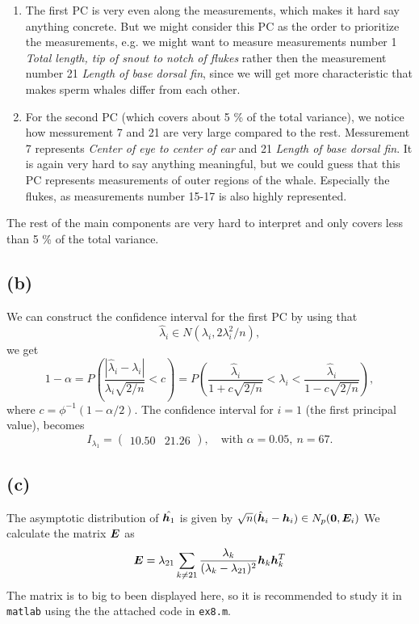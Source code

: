\begin{enumerate}
\item The first PC is very even along the measurements, which makes it
  hard say anything concrete. But we might consider this PC as the
  order to prioritize the measurements, e.g. we might want to measure
  measurements number 1 \textit{Total length, tip of snout to notch of
    flukes} rather then the measurement number 21 \textit{Length of base
    dorsal fin}, since we will get more characteristic that makes sperm
  whales differ from each other.
\item For the second PC (which  covers about 5 \% of the total variance), we notice how messurement 7 and 21 are very
  large compared to the rest. Messurement 7 represents \textit{Center of
    eye to center of ear} and 21 \textit{Length of base  dorsal fin}. It
  is again very hard to say anything meaningful, but we could guess that
  this PC represents measurements of outer regions of the
  whale. Especially the flukes, as measurements number 15-17 is also
  highly represented.
\end{enumerate}
The rest of the main components are very hard to interpret and only
covers less than 5 \% of the total variance.

\subsection*{(b)}
\label{sec:b-7}
 We can construct the confidence interval for the first PC by using
 that
 \begin{equation*}
   \hat\lambda_i \in N(\lambda_i, 2\lambda^2_i/n),
 \end{equation*}
we get
\begin{equation*}
 1- \alpha =  P\left(\frac{|\hat\lambda_i - \lambda_i|}{\lambda_i\sqrt{2/n}} < c\right) =
 P\left(\frac{\hat\lambda_i}{1 + c\sqrt{2/n}} < \lambda_{i} < \frac{\hat\lambda_i}{1 - c\sqrt{2/n}}\right),
\end{equation*}
where $c = \phi^{-1}(1 - \alpha/2)$. The confidence interval for $i =
1$ (the first principal value), becomes
\begin{equation*}
  I_{\lambda_{1}} =
  \begin{pmatrix}
    10.50 &21.26 
  \end{pmatrix}
, \quad \text{with }\alpha = 0.05,\ n = 67.
\end{equation*}

\subsection*{(c)}
\label{sec:c-7}
The asymptotic distribution of $ \hat{\bm{h}_1}$ is given by $\sqrt n
(\hat{\bm{h}}_i - \bm{h}_i) \in N_p(\bm{0}, \bm{E}_i)$
We calculate the matrix $\bm{E}$ as
\begin{equation*}
  \bm{E} = \lambda_{21} \sum_{k \neq 21}\frac{\lambda_k}{(\lambda_k -
    \lambda_{21})^2 }\bm{h}_k \bm{h}_k^T
\end{equation*}
The matrix is to big to been displayed here, so it is recommended to
study it in \texttt{matlab} using the the attached code in
\texttt{ex8.m}.

